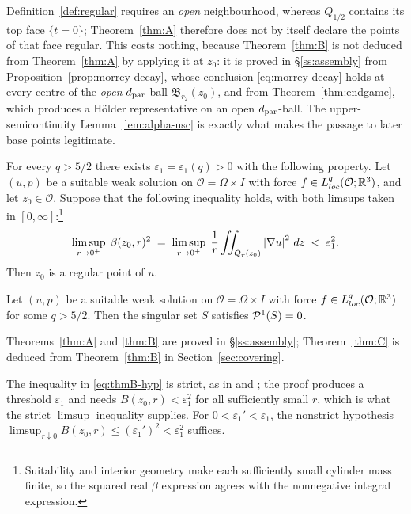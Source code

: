 \documentclass[11pt,reqno]{amsart}
\begin{document}
\begin{remark}\label{rem:top-face}
Definition~\ref{def:regular} requires an \emph{open} neighbourhood, whereas
$Q_{1/2}$ contains its top face $\{t=0\}$; Theorem~\ref{thm:A} therefore does
not by itself declare the points of that face regular. This costs nothing,
because Theorem~\ref{thm:B} is not deduced from Theorem~\ref{thm:A} by applying
it at $z_{0}$: it is proved in \S\ref{ss:assembly} from
Proposition~\ref{prop:morrey-decay}, whose conclusion
\eqref{eq:morrey-decay} holds at every centre of the \emph{open}
$d_{\mathrm{par}}$-ball $\mathfrak{B}_{r_{2}}(z_{0})$, and from
Theorem~\ref{thm:endgame}, which produces a H\"older representative on an open
$d_{\mathrm{par}}$-ball. The upper-semicontinuity Lemma~\ref{lem:alpha-usc} is exactly what
makes the passage to later base points legitimate.
\end{remark}

\begin{theorem}\label{thm:B}
For every $q>5/2$ there exists $\varepsilon_{1}=\varepsilon_{1}(q)>0$ with the
following property. Let $(u,p)$ be a suitable weak solution on
$\mathcal{O}=\Omega\times I$ with force $f\in L^{q}_{loc}(\mathcal{O};\mathbb{R}^{3})$,
and let $z_{0}\in\mathcal{O}$. Suppose that the following inequality holds,
with both limsups taken in $[0,\infty]$:\footnote{Suitability and interior
geometry make each sufficiently small cylinder mass finite, so the squared
real $\beta$ expression agrees with the nonnegative integral expression.}
\begin{equation}\label{eq:thmB-hyp}
  \limsup_{r\to0^{+}}\;\beta(z_{0},r)^{2}
  \;=\;\limsup_{r\to0^{+}}\;\frac1r\iint_{Q_{r}(z_{0})}\left\lvert \nabla u \right\rvert^{2}\,dz
  \;<\;\varepsilon_{1}^{2}.
\end{equation}
Then $z_{0}$ is a regular point of $u$.
\end{theorem}

\begin{theorem}\label{thm:C}
Let $(u,p)$ be a suitable weak solution on $\mathcal{O}=\Omega\times I$ with
force $f\in L^{q}_{loc}(\mathcal{O};\mathbb{R}^{3})$ for some $q>5/2$. Then the singular
set $S$ satisfies $\mathcal{P}^{1}(S)=0$.
\end{theorem}

Theorems~\ref{thm:A} and \ref{thm:B} are proved in \S\ref{ss:assembly};
Theorem~\ref{thm:C} is deduced from Theorem~\ref{thm:B} in
Section~\ref{sec:covering}.

\begin{remark}\label{rem:strict}
The inequality in \eqref{eq:thmB-hyp} is strict, as in
\cite[Theorem 2.2]{LadyzhenskayaSeregin1999} and
\cite[Theorem 1]{Kukavica2008}; the proof produces a threshold
$\varepsilon_{1}$ and needs $B(z_{0},r)<\varepsilon_{1}^{2}$ for all sufficiently
small $r$, which is what the strict $\limsup$ inequality supplies. For
$0<\varepsilon_{1}'<\varepsilon_{1}$, the nonstrict hypothesis
$\limsup_{r\downarrow0}B(z_{0},r)\le(\varepsilon_{1}')^{2}<\varepsilon_{1}^{2}$ suffices.
\end{remark}
\end{document}
